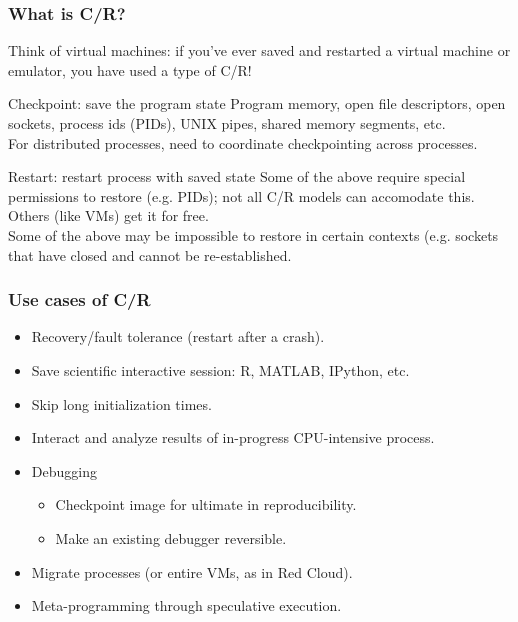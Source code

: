 \documentclass[compress]{beamer}
\begin{document}
\begin{frame}
\frametitle{What is C/R?}

Think of virtual machines: if you've ever saved and restarted a virtual machine
or emulator, you have used a type of C/R!

\begin{block}{Checkpoint: save the program state}
  Program memory, open file descriptors, open sockets, process ids (PIDs), UNIX pipes,
  shared memory segments, etc.\\
\vspace{1ex}
For distributed processes, need to coordinate checkpointing across processes.\\
\end{block}

\begin{block}{Restart: restart process with saved state}
  Some of the above require special permissions to restore (e.g. PIDs); not all
  C/R models can accomodate this. Others (like VMs) get it for free.\\
\vspace{1ex}
  Some of the above may be impossible to restore in certain contexts (e.g. sockets
  that have closed and cannot be re-established.\\
\end{block}


\end{frame}
  


\begin{frame}
\frametitle{Use cases of C/R}

\begin{itemize}
  \item{Recovery/fault tolerance (restart after a crash).}
  \item{Save scientific interactive session: R, MATLAB, IPython, etc.}
  \item{Skip long initialization times.}
  \item{Interact and analyze results of in-progress CPU-intensive process.}
  \item{Debugging}
    \begin{itemize}
    \item{Checkpoint image for ultimate in reproducibility.}
    \item{Make an existing debugger reversible.}
    \end{itemize}
  \item{Migrate processes (or entire VMs, as in Red Cloud).}
  \item{Meta-programming through speculative execution.}
\end{itemize}
    
\end{frame}
\end{document}
